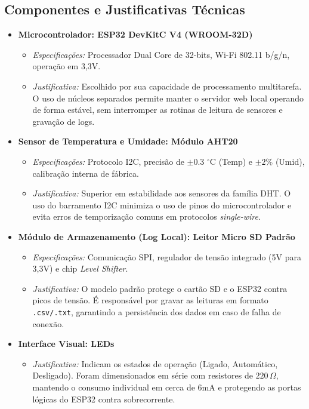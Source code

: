 \subsection{Componentes e Justificativas Técnicas}
\begin{itemize}[leftmargin=*]
    \item \textbf{Microcontrolador: ESP32 DevKitC V4 (WROOM-32D)}
    \begin{itemize}
        \item \textit{Especificações:} Processador Dual Core de 32-bits, Wi-Fi 802.11 b/g/n, operação em 3,3V.
        \item \textit{Justificativa:} Escolhido por sua capacidade de processamento multitarefa. O uso de núcleos separados permite manter o servidor web local operando de forma estável, sem interromper as rotinas de leitura de sensores e gravação de logs.
    \end{itemize}

    \item \textbf{Sensor de Temperatura e Umidade: Módulo AHT20}
    \begin{itemize}
        \item \textit{Especificações:} Protocolo I2C, precisão de $\pm 0.3$ $^\circ$C (Temp) e $\pm 2\%$ (Umid), calibração interna de fábrica.
        \item \textit{Justificativa:} Superior em estabilidade aos sensores da família DHT. O uso do barramento I2C minimiza o uso de pinos do microcontrolador e evita erros de temporização comuns em protocolos \textit{single-wire}.
    \end{itemize}

    \item \textbf{Módulo de Armazenamento (Log Local): Leitor Micro SD Padrão}
    \begin{itemize}
        \item \textit{Especificações:} Comunicação SPI, regulador de tensão integrado (5V para 3,3V) e chip \textit{Level Shifter}.
        \item \textit{Justificativa:} O modelo padrão protege o cartão SD e o ESP32 contra picos de tensão. É responsável por gravar as leituras em formato \texttt{.csv/.txt}, garantindo a persistência dos dados em caso de falha de conexão.
    \end{itemize}

    \item \textbf{Interface Visual: LEDs}
    \begin{itemize}
        \item \textit{Justificativa:} Indicam os estados de operação (Ligado, Automático, Desligado). Foram dimensionados em série com resistores de $220\,\Omega$, mantendo o consumo individual em cerca de 6mA e protegendo as portas lógicas do ESP32 contra sobrecorrente.
    \end{itemize}
\end{itemize}

